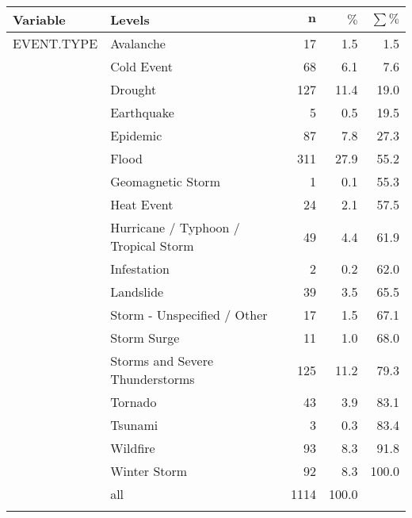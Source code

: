 \begingroup\footnotesize
\begin{longtable}{ll|rrr}
 \textbf{Variable} & \textbf{Levels} & $\mathbf{n}$ & $\mathbf{\%}$ & $\mathbf{\sum \%}$ \\ 
  \hline
EVENT.TYPE & Avalanche & 17 & 1.5 & 1.5 \\ 
   & Cold Event & 68 & 6.1 & 7.6 \\ 
   & Drought & 127 & 11.4 & 19.0 \\ 
   & Earthquake & 5 & 0.5 & 19.5 \\ 
   & Epidemic & 87 & 7.8 & 27.3 \\ 
   & Flood & 311 & 27.9 & 55.2 \\ 
   & Geomagnetic Storm & 1 & 0.1 & 55.3 \\ 
   & Heat Event & 24 & 2.1 & 57.5 \\ 
   & Hurricane / Typhoon / Tropical Storm & 49 & 4.4 & 61.9 \\ 
   & Infestation & 2 & 0.2 & 62.0 \\ 
   & Landslide & 39 & 3.5 & 65.5 \\ 
   & Storm - Unspecified / Other & 17 & 1.5 & 67.1 \\ 
   & Storm Surge & 11 & 1.0 & 68.0 \\ 
   & Storms and Severe Thunderstorms & 125 & 11.2 & 79.3 \\ 
   & Tornado & 43 & 3.9 & 83.1 \\ 
   & Tsunami & 3 & 0.3 & 83.4 \\ 
   & Wildfire & 93 & 8.3 & 91.8 \\ 
   & Winter Storm & 92 & 8.3 & 100.0 \\ 
   \hline
 & all & 1114 & 100.0 &  \\ 
   \hline
\hline

   \hline
\hline
\hline
\caption{} 
\label{}
\end{longtable}
\endgroup

